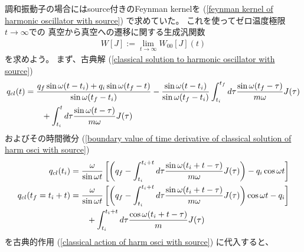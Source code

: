 調和振動子の場合にはsource付きのFeynman kernelを
(\ref{feynman kernel of harmonic oscillator with source})
で求めていた。
これを使ってゼロ温度極限$t \to \infty$での
真空から真空への遷移に関する生成汎関数
\begin{align}
    W[J]
    :=
    \lim_{t \to \infty}
    W_{00}[J](t)
\end{align}
を求めよう。
まず、古典解
(\ref{classical solution to harmonic oscillator with source})
\begin{align}
    q_{cl}(t)
    &=
    \frac{
        q_f \sin \omega (t - t_i)
        +
        q_i \sin \omega (t_f - t)
    }{ \sin \omega (t_f - t_i) }
    -
    \frac{ \sin \omega (t - t_i) }{
        \sin \omega(t_f - t_i)
    }
    \int_{t_i}^{t_f} d\tau
    \frac{ \sin \omega (t_f-\tau) }{m\omega}
    J(\tau)
\notag\\&\qquad
    +
    \int_{t_i}^t d\tau
    \frac{ \sin \omega (t-\tau)}{m\omega}
    J(\tau)
\end{align}
およびその時間微分
(\ref{boundary value of time derivative of classical solution of harm osci with source})
\begin{subequations}
\begin{align}
    \dot{q}_{cl} (t_i)
    &=
    \dfrac{ \omega }{ \sin \omega t }
    \left[
    \left(
        q_f
    -
        \int_{t_i}^{t_i + t} d\tau
        \frac{ \sin \omega (t_i + t - \tau) }{m\omega}
        J(\tau)
    \right)
    -
        q_i \cos \omega t
    \right]
\\
    \dot{q}_{cl} (t_f = t_i + t)
    &=
    \frac{ \omega }{ \sin \omega t }
    \left[
    \left(
        q_f
    -
        \int_{t_i}^{t_i + t} d\tau
        \frac{ \sin \omega (t_i + t - \tau) }{m\omega}
        J(\tau)
    \right)
    \cos \omega t
    -
        q_i
    \right]
\notag\\&\qquad
    +
    \int_{t_i}^{t_i + t} d\tau
    \frac{ \cos \omega (t_i + t - \tau)}{m}
    J(\tau)
\end{align}
\end{subequations}
を古典的作用
(\ref{classical action of harm osci with source})
に代入すると、

